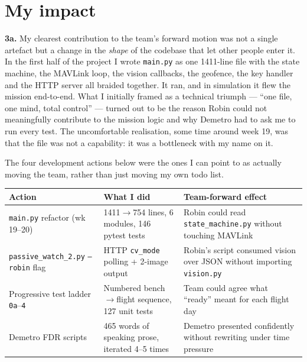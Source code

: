 
\section*{My impact}

\textbf{3a.} My clearest contribution to the team's forward motion was not a single artefact but a change in the \emph{shape} of the codebase that let other people enter it. In the first half of the project I wrote \texttt{main.py} as one 1411-line file with the state machine, the MAVLink loop, the vision callbacks, the geofence, the key handler and the HTTP server all braided together. It ran, and in simulation it flew the mission end-to-end. What I initially framed as a technical triumph --- ``one file, one mind, total control'' --- turned out to be the reason Robin could not meaningfully contribute to the mission logic and why Demetro had to ask me to run every test. The uncomfortable realisation, some time around week 19, was that the file was not a capability: it was a bottleneck with my name on it.

The four development actions below were the ones I can point to as actually moving the team, rather than just moving my own todo list.

\begin{center}
\small
\begin{tabular}{@{}p{3.2cm}p{4.4cm}p{4.8cm}@{}}
\toprule
\textbf{Action} & \textbf{What I did} & \textbf{Team-forward effect} \\
\midrule
\texttt{main.py} refactor (wk 19--20) & 1411$\rightarrow$754 lines, 6 modules, 146 pytest tests & Robin could read \texttt{state\_machine.py} without touching MAVLink \\
\addlinespace[2pt]
\texttt{passive\_watch\_2.py} \texttt{--robin} flag & HTTP \texttt{cv\_mode} polling + 2-image output & Robin's script consumed vision over JSON without importing \texttt{vision.py} \\
\addlinespace[2pt]
Progressive test ladder \texttt{0a}--\texttt{4} & Numbered bench$\rightarrow$flight sequence, 127 unit tests & Team could agree what ``ready'' meant for each flight day \\
\addlinespace[2pt]
Demetro FDR scripts & 465 words of speaking prose, iterated 4--5 times & Demetro presented confidently without rewriting under time pressure \\
\bottomrule
\end{tabular}
\end{center}

